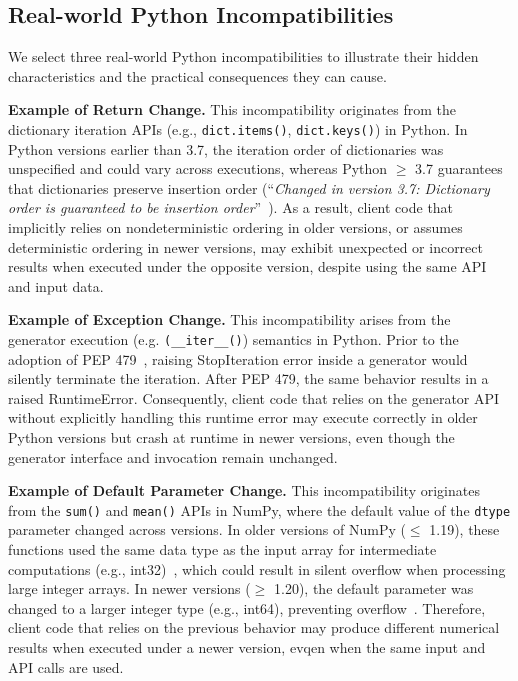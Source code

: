 

\subsection{Real-world Python Incompatibilities}

We select three real-world Python incompatibilities to illustrate their hidden characteristics and the practical consequences they can cause.

\textbf{Example of Return Change.} This incompatibility originates from the dictionary iteration APIs (e.g., \texttt{dict.items()}, \texttt{dict.keys()}) in Python. In Python versions earlier than 3.7, the iteration order of dictionaries was unspecified and could vary across executions, whereas Python $\ge$ 3.7 guarantees that dictionaries preserve insertion order (``\textit{Changed in version 3.7: Dictionary order is guaranteed to be insertion order}''~\cite{python37example, so1}). As a result, client code that implicitly relies on nondeterministic ordering in older versions, or assumes deterministic ordering in newer versions, may exhibit unexpected or incorrect results when executed under the opposite version, despite using the same API and input data.

\textbf{Example of Exception Change.} This incompatibility arises from the generator execution (e.g. \texttt{(\_\_iter\_\_()}) semantics in Python. Prior to the adoption of PEP 479~\cite{pep479}, raising StopIteration error inside a generator would silently terminate the iteration. After PEP 479, the same behavior results in a raised RuntimeError. Consequently, client code that relies on the generator API without explicitly handling this runtime error may execute correctly in older Python versions but crash at runtime in newer versions, even though the generator interface and invocation remain unchanged.

\textbf{Example of Default Parameter Change.} This incompatibility originates from the \texttt{sum()} and \texttt{mean()} APIs in NumPy, where the default value of the \texttt{dtype} parameter changed across versions. In older versions of NumPy ($\le$ 1.19), these functions used the same data type as the input array for intermediate computations (e.g., int32)~\cite{w3cub}, which could result in silent overflow when processing large integer arrays. In newer versions ($\ge$ 1.20), the default parameter was changed to a larger integer type (e.g., int64), preventing overflow~\cite{so2, numpy17}. Therefore, client code that relies on the previous behavior may produce different numerical results when executed under a newer version, evqen when the same input and API calls are used.


